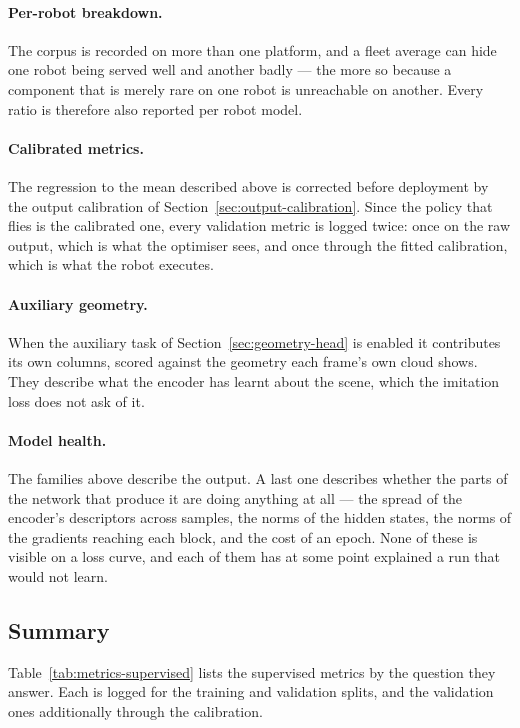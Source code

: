 \paragraph{Per-robot breakdown.}
The corpus is recorded on more than one platform, and a fleet average can hide
one robot being served well and another badly --- the more so because a
component that is merely rare on one robot is unreachable on another. Every
ratio is therefore also reported per robot model.

\paragraph{Calibrated metrics.}
The regression to the mean described above is corrected before deployment by the
output calibration of Section~\ref{sec:output-calibration}. Since the policy that
flies is the calibrated one, every validation metric is logged twice: once on
the raw output, which is what the optimiser sees, and once through the fitted
calibration, which is what the robot executes.

\paragraph{Auxiliary geometry.}
When the auxiliary task of Section~\ref{sec:geometry-head} is enabled it
contributes its own columns, scored against the geometry each frame's own cloud
shows. They describe what the encoder has learnt about the scene, which the
imitation loss does not ask of it.

\paragraph{Model health.}
The families above describe the output. A last one describes whether the parts
of the network that produce it are doing anything at all --- the spread of the
encoder's descriptors across samples, the norms of the hidden states, the norms
of the gradients reaching each block, and the cost of an epoch. None of these is
visible on a loss curve, and each of them has at some point explained a run that
would not learn.

\subsection{Summary}

Table~\ref{tab:metrics-supervised} lists the supervised metrics by the
question they answer. Each is logged for the training and validation splits,
and the validation ones additionally through the calibration.

